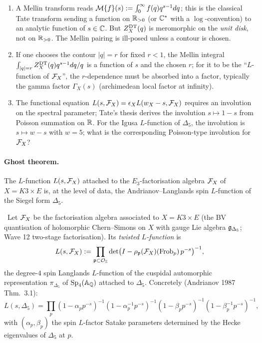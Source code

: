 \begin{enumerate}[label=\textbf{O.\arabic*},leftmargin=1.5em]
\item A Mellin transform reads $\mathcal{M}\{f\}(s):=\int_0^\infty
  f(q)q^{s-1}dq$; this is the classical Tate transform sending a
  function on $\mathbb{R}_{>0}$ (or $\mathbb{C}^*$ with a $\log$-convention) to
  an analytic function of $s\in\mathbb{C}$. But $Z^{\mathrm{DT}}_X(q)$ is
  meromorphic on the \emph{unit disk}, not on $\mathbb{R}_{>0}$. The
  Mellin pairing is ill-posed unless a contour is chosen.
\item If one chooses the contour $|q|=r$ for fixed $r<1$, the
  Mellin integral $\int_{|q|=r}Z^{\mathrm{DT}}_X(q)q^{s-1}dq/q$ is a
  function of $s$ and the chosen $r$; for it to be the
  ``$L$-function of $\mathcal{F}_X$'', the $r$-dependence must be
  absorbed into a factor, typically the gamma factor $\Gamma_X(s)$
  (archimedean local factor at infinity).
\item The functional equation $L(s,\mathcal{F}_X)=\epsilon_X
  L(w_X-s,\mathcal{F}_X)$ requires an involution on the spectral
  parameter; Tate's thesis derives the involution
  $s\mapsto 1-s$ from Poisson summation on $\mathbb{R}$. For the Igusa
  $L$-function of $\Delta_5$, the involution is $s\mapsto w-s$
  with $w=5$; what is the corresponding Poisson-type
  involution for $\mathcal{F}_X$?
\end{enumerate}

\paragraph{Ghost theorem.}
The $L$-function $L(s,\mathcal{F}_X)$ attached to the $E_3$-factorisation
algebra $\mathcal{F}_X$ of $X=K3\times E$ is, at the level of data, the
Andrianov--Langlands spin $L$-function of the Siegel form
$\Delta_5$.

\ClaimStatusDefinition\ Let $\mathcal{F}_X$ be the factorisation algebra
associated to $X=K3\times E$ (the BV quantisation of holomorphic
Chern--Simons on $X$ with gauge Lie algebra $\mathfrak{g}_{\Delta_5}$; Wave
12 two-stage factorisation). Its \emph{twisted $L$-function} is
\[
L(s,\mathcal{F}_X):=\prod_{\mathfrak p\subset\mathcal{O}_{\mathbb{Z}}}
\det\bigl(I-\rho_{\mathfrak p}(\mathcal{F}_X)(\mathrm{Frob}_p)\,p^{-s}\bigr)^{-1},
\]
the degree-$4$ spin Langlands $L$-function of the cuspidal
automorphic representation $\pi_{\Delta_5}$ of $\mathrm{Sp}_4(\mathbb
A_{\mathbb{Q}})$ attached to $\Delta_5$. Concretely (Andrianov 1987 Thm.\
3.1):
\[
L(s,\Delta_5)=\prod_p(1-\alpha_p p^{-s})^{-1}(1-\alpha_p^{-1} p^{-s})^{-1}
(1-\beta_p p^{-s})^{-1}(1-\beta_p^{-1} p^{-s})^{-1},
\]
with $(\alpha_p,\beta_p)$ the spin $L$-factor Satake parameters
determined by the Hecke eigenvalues of $\Delta_5$ at $p$.

